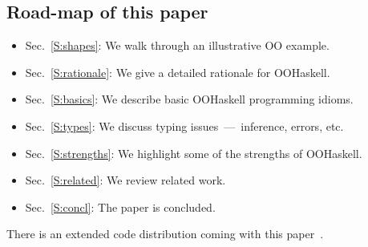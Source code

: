 \medskip

\subsection*{Road-map of this paper}

\begin{itemize}
\item Sec.~\ref{S:shapes}: We walk through an illustrative OO example.
\item Sec.~\ref{S:rationale}: We give a detailed rationale for OOHaskell.
\item Sec.~\ref{S:basics}: We describe basic OOHaskell programming idioms.
\item Sec.~\ref{S:types}: We discuss typing issues~---~inference, errors, etc.
\item Sec.~\ref{S:strengths}: We highlight some of the strengths of OOHaskell.
\item Sec.~\ref{S:related}: We review related work.
\item Sec.~\ref{S:concl}: The paper is concluded.
\end{itemize}
%
There is an extended code distribution coming with this paper~\cite{OOHaskell}.

\begin{comment}

In Sec.~\ref{S:HList}, we briefly review the \HList\
library~\cite{HLIST-HW04}, which provides extensible polymorphic
heterogeneous records with first-class labels.  In
Sec.~\ref{S:simple}, we introduce more basic OO notions such as
objects and constructors. In Sec.~\ref{S:self}, we describe open
recursion, which allows us to cover rich forms of inheritance.  In
Sec.~\ref{S:shapes}, we handle a prototypical scenario for subtype
polymorphism in detail. In~\ref{S:disc}, we very briefly discuss all
remaining issues~---~including some technicalities, conclusions, and
directions for future work.

\end{comment}